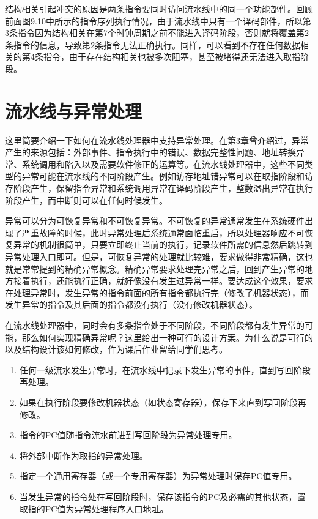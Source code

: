 \documentclass[]{ctexbook}
\providecommand{\tightlist}{%
  \setlength{\itemsep}{0pt}\setlength{\parskip}{0pt}}
\begin{document}
结构相关引起冲突的原因是两条指令要同时访问流水线中的同一个功能部件。回顾前面图9.10中所示的指令序列执行情况，由于流水线中只有一个译码部件，所以第3条指令因为结构相关在第7个时钟周期之前不能进入译码阶段，否则就将覆盖第2条指令的信息，导致第2条指令无法正确执行。同样，可以看到不存在任何数据相关的第4条指令，由于存在结构相关也被多次阻塞，甚至被堵得还无法进入取指阶段。

\hypertarget{sec-precise-exception}{%
\section{流水线与异常处理}\label{sec-precise-exception}}

这里简要介绍一下如何在流水线处理器中支持异常处理。在第3章曾介绍过，异常产生的来源包括：外部事件、指令执行中的错误、数据完整性问题、地址转换异常、系统调用和陷入以及需要软件修正的运算等。在流水线处理器中，这些不同类型的异常可能在流水线的不同阶段产生。例如访存地址错异常可以在取指阶段和访存阶段产生，保留指令异常和系统调用异常在译码阶段产生，整数溢出异常在执行阶段产生，而中断则可以在任何时候发生。

异常可以分为可恢复异常和不可恢复异常。不可恢复的异常通常发生在系统硬件出现了严重故障的时候，此时异常处理后系统通常面临重启，所以处理器响应不可恢复异常的机制很简单，只要立即终止当前的执行，记录软件所需的信息然后跳转到异常处理入口即可。但是，可恢复异常的处理就比较难，要求做得非常精确，这也就是常常提到的精确异常概念。精确异常要求处理完异常之后，回到产生异常的地方接着执行，还能执行正确，就好像没有发生过异常一样。要达成这个效果，要求在处理异常时，发生异常的指令前面的所有指令都执行完（修改了机器状态），而发生异常的指令及其后面的指令都没有执行（没有修改机器状态）。

在流水线处理器中，同时会有多条指令处于不同阶段，不同阶段都有发生异常的可能，那么如何实现精确异常呢？这里给出一种可行的设计方案。为什么说是可行的以及结构设计该如何修改，作为课后作业留给同学们思考。

\begin{enumerate}
\def\labelenumi{\arabic{enumi})}
\tightlist
\item
  任何一级流水发生异常时，在流水线中记录下发生异常的事件，直到写回阶段再处理。
\item
  如果在执行阶段要修改机器状态（如状态寄存器），保存下来直到写回阶段再修改。
\item
  指令的PC值随指令流水前进到写回阶段为异常处理专用。
\item
  将外部中断作为取指的异常处理。
\item
  指定一个通用寄存器（或一个专用寄存器）为异常处理时保存PC值专用。
\item
  当发生异常的指令处在写回阶段时，保存该指令的PC及必需的其他状态，置取指的PC值为异常处理程序入口地址。
\end{enumerate}
\end{document}
